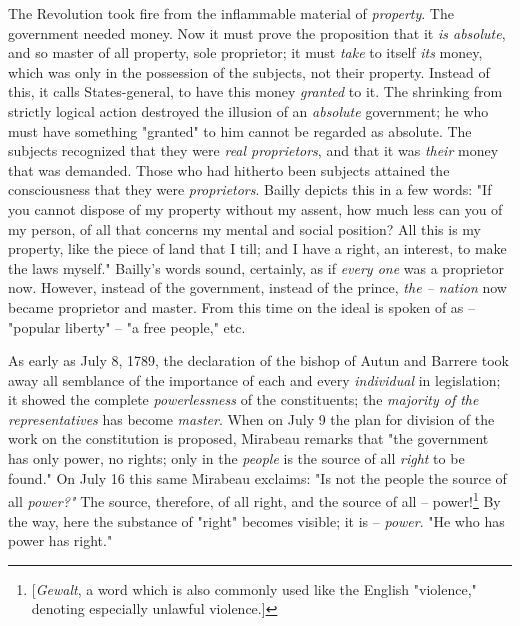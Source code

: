 The Revolution took fire from the inflammable material of \textit{property}. 
The government needed money. Now it must prove the proposition that it 
\textit{is absolute}, and so master of all property, sole proprietor; it must 
\textit{take} to itself \textit{its} money, which was only in the possession 
of the subjects, not their property. Instead of this, it calls States-general, 
to have this money \textit{granted} to it. The shrinking from strictly logical 
action destroyed the illusion of an \textit{absolute} government; he who must 
have something "{}granted"{} to him cannot be regarded as absolute. The 
subjects recognized that they were \textit{real proprietors}, and that it was 
\textit{their} money that was demanded. Those who had hitherto been subjects 
attained the consciousness that they were \textit{proprietors}. Bailly depicts 
this in a few words: "{}If you cannot dispose of my property without my 
assent, how much less can you of my person, of all that concerns my mental and 
social position? All this is my property, like the piece of land that I till; 
and I have a right, an interest, to make the laws myself."{} Bailly's words 
sound, certainly, as if \textit{every one} was a proprietor now. However, 
instead of the government, instead of the prince, \textit{the -- nation} now 
became proprietor and master. From this time on the ideal is spoken of as -- 
"{}popular liberty"{} -- "{}a free people,"{} etc.

As early as July 8, 1789, the declaration of the bishop of Autun and Barrere 
took away all semblance of the importance of each and every 
\textit{individual} in legislation; it showed the complete 
\textit{powerlessness} of the constituents; the \textit{majority of the 
representatives} has become \textit{master}. When on July 9 the plan for 
division of the work on the constitution is proposed, Mirabeau remarks that 
"{}the government has only power, no rights; only in the \textit{people} is 
the source of all \textit{right} to be found."{} On July 16 this same Mirabeau 
exclaims: "{}Is not the people the source of all \textit{power?"{}} The 
source, therefore, of all right, and the source of all -- 
power!\footnote{[\textit{Gewalt}, a word which is also commonly used like the 
English "{}violence,"{} denoting especially unlawful violence.]} By the way, 
here the substance of "{}right"{} becomes visible; it is -- \textit{power}. 
"{}He who has power has right."{}

